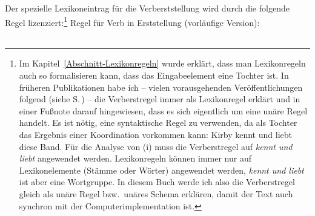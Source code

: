 Der spezielle Lexikoneintrag für die Verberststellung wird durch die folgende
Regel lizenziert:\footnote{
Im Kapitel~\ref{Abschnitt-Lexikonregeln} wurde erklärt, dass man Lexikonregeln auch so formalisieren
kann, dass das Eingabeelement eine Tochter ist. In früheren Publikationen habe ich -- vielen
vorausgehenden Veröffentlichungen folgend (siehe S.\,\pageref{Seite-V1-via-Lexikonregel}) -- die
Verberstregel immer als Lexikonregel erklärt und in einer Fußnote darauf hingewiesen, dass es sich
eigentlich um eine unäre Regel handelt. Es ist nötig, eine syntaktische Regel zu verwenden, da als
Tochter das Ergebnis einer Koordination vorkommen kann:
\ea
Kirby kennt und liebt diese Band.
\z
Für die Analyse von (i) muss die Verberstregel auf \emph{kennt und liebt} angewendet
werden. Lexikonregeln können immer nur auf Lexikonelemente (Stämme oder Wörter) angewendet werden,
\emph{kennt und liebt} ist aber eine Wortgruppe. In diesem Buch werde ich also die Verberstregel
gleich als unäre Regel bzw.\ unäres Schema erklären, damit der Text auch synchron mit der
Computerimplementation ist. 
}
\eas
\label{lr-verb-movement}%
Regel für Verb in Erststellung (vorläufige Version):\\
 \impl\\
\zs

